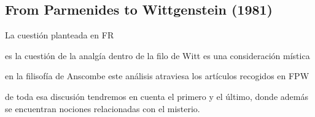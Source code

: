 \subsection{From Parmenides to Wittgenstein (1981)}
La cuestión planteada en FR

es la cuestión de la analgía
dentro de la filo de Witt es una consideración mística

en la filisofía de Anscombe este análisis atraviesa los artículos recogidos en FPW

de toda esa discusión tendremos en cuenta el primero y el último, donde además se encuentran nociones relacionadas con el misterio.
